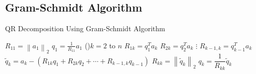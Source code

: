 \subsection{Gram-Schmidt Algorithm}

\begin{algorithm}[htbp]
    \caption{QR Decomposition Using Gram-Schmidt Algorithm}

    $R_{11}=\left\|a_{1}\right\|_{2}$ \;
     $q_{1}=\frac{1}{R_{11}} a_{1}$ \;
\For(){$k=2$ to $n$}{
$R_{1 k} =q_{1}^{T} a_{k}$ \;
$R_{2 k} =q_{2}^{T} a_{k} $\;
 $\vdots$ \;
$R_{k-1, k} =q_{k-1}^{T} a_{k}$ \;
$\tilde{q}_{k} =a_{k}-\left(R_{1 k} q_{1}+R_{2 k} q_{2}+\cdots+R_{k-1, k} q_{k-1}\right)$ \;
$R_{k k} =\left\|\tilde{q}_{k}\right\|_{2}$ \;
 $q_{k} =\dfrac{1}{R_{k k}} \tilde{q}_{k}$ \;
}
\end{algorithm}


